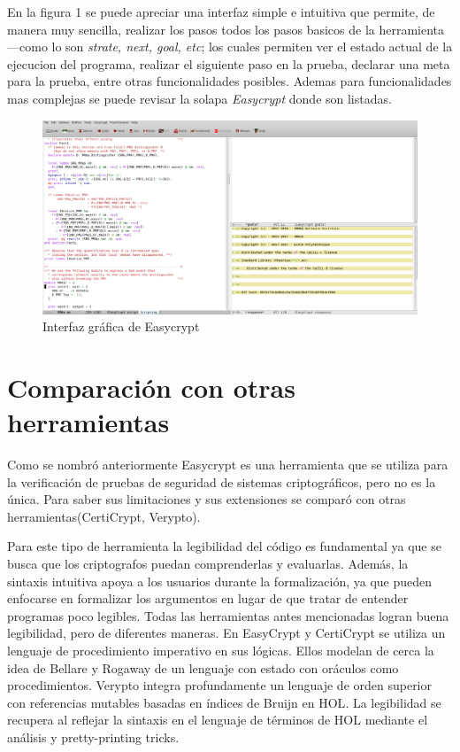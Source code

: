 \documentclass[runningheads]{llncs}
\begin{document}
En la figura 1 se puede apreciar una interfaz simple e intuitiva que permite, de manera muy sencilla, realizar los pasos todos los pasos basicos de la herramienta—como lo son \textit{strate, next, goal, etc}; los cuales permiten ver el estado actual de la ejecucion del programa, realizar el siguiente paso en la prueba, declarar una meta para la prueba, entre otras funcionalidades posibles. Ademas para funcionalidades mas complejas se puede revisar la solapa \textit{Easycrypt} donde son listadas.

\begin{figure}[H]
\includegraphics[width=\textwidth]{figura1.png}
\caption{Interfaz gráfica de Easycrypt} \label{fig1}
\end{figure}

\section{Comparación con otras herramientas}
Como se nombró anteriormente Easycrypt es una herramienta que se utiliza para la verificación de pruebas de seguridad de sistemas criptográficos, pero no es la única. Para saber sus limitaciones y sus extensiones se comparó con otras herramientas(CertiCrypt, Verypto).

 Para este tipo de herramienta la legibilidad del código es fundamental ya que se busca que los criptografos puedan comprenderlas y evaluarlas. Además, la sintaxis intuitiva apoya a los usuarios durante la formalización, ya que pueden enfocarse en formalizar los argumentos en lugar de que tratar de entender programas poco legibles. Todas las herramientas antes mencionadas logran buena legibilidad, pero de diferentes maneras. En EasyCrypt y CertiCrypt se utiliza un lenguaje de procedimiento imperativo en sus lógicas. Ellos modelan de cerca la idea de Bellare y Rogaway de un lenguaje con estado con oráculos como procedimientos\cite{ref_article3}. Verypto integra profundamente un lenguaje de orden superior con referencias mutables basadas en índices de Bruijn en HOL\cite{ref_article4}. La legibilidad se recupera al reflejar la sintaxis en el lenguaje de términos de HOL mediante el análisis y pretty-printing tricks.
\end{document}
